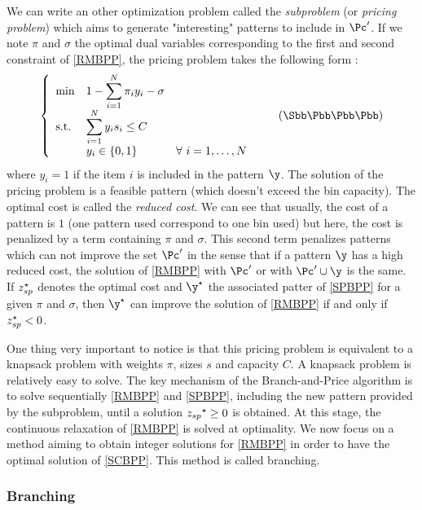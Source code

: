 We can write an other optimization problem called the \textit{subproblem} (or \textit{pricing problem}) which aims to generate "interesting" patterns to include in $\Pc'$. If we note $\pi$ and $\sigma$ the optimal dual variables corresponding to the first and second constraint of \eqref{RMBPP}, the pricing problem takes the following form :
\begin{equation}
	\label{SPBPP}
		\left \{
		\begin{array}{*5{>{\displaystyle}l}}
		\min & 1-\sum_{i=1}^{N} \pi_i y_i - \sigma \\
		\st & \sum_{i=1}^{N} y_i s_i \leq C \\
		& y_i \in \{0,1\} &  \forall \ i = 1,\dots,N
		\end{array}
		\right.
	\tag{$\Sbb\Pbb\Bbb\Pbb\Pbb$}
\end{equation}
where $y_i=1$ if the item $i$ is included in the pattern $\y$. The solution of the pricing problem is a feasible pattern (\ie which doesn't exceed the bin capacity). The optimal cost is called the \textit{reduced cost}. We can see that usually, the cost of a pattern is $1$ (one pattern used correspond to one bin used) but here, the cost is penalized by a term containing $\pi$ and $\sigma$. This second term penalizes patterns which can not improve the set $\Pc'$ in the sense that if a pattern $\y$ has a high reduced cost, the solution of \eqref{RMBPP} with $\Pc'$ or with $\Pc' \cup \y$ is the same. If ${z}^{\star}_{sp}$ denotes the optimal cost and $\opt{\y}$ the associated patter of \eqref{SPBPP} for a given $\pi$ and $\sigma$, then $\opt{\y}$ can improve the solution of \eqref{RMBPP}
if and only if ${z}^{\star}_{sp}<0$.

One thing very important to notice is that this pricing problem is equivalent to a knapsack problem with weights $\pi$, sizes $s$ and capacity $C$. A knapsack problem is relatively easy to solve. The key mechanism of the Branch-and-Price algorithm is to solve sequentially \eqref{RMBPP} and \eqref{SPBPP}, including the new pattern provided by the subproblem, until a solution ${z_{sp}}^{\star} \geq 0$ is obtained. At this stage, the continuous relaxation of \eqref{RMBPP} is solved at optimality. We now focus on a method aiming to obtain integer solutions for \eqref{RMBPP} in order to have the optimal solution of \eqref{SCBPP}. This method is called branching.

\subsubsection{Branching}

